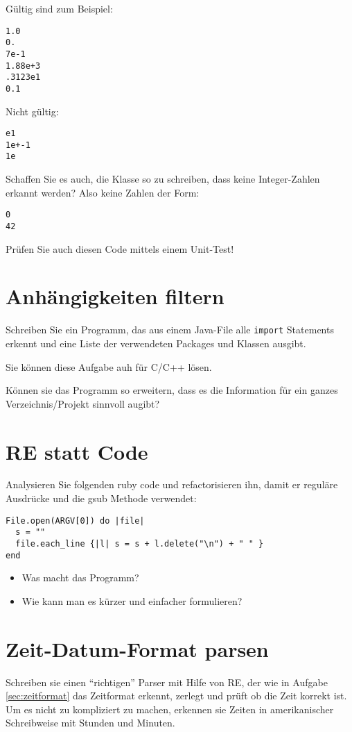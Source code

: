 \documentclass[a4paper,11pt,oneside]{scrbook}
\begin{document}
Gültig sind zum Beispiel:
\begin{lstlisting}
1.0
0.
7e-1
1.88e+3
.3123e1
0.1
\end{lstlisting}

Nicht gültig:
\begin{lstlisting}
e1
1e+-1
1e
\end{lstlisting}

Schaffen Sie es auch, die Klasse so zu schreiben, dass keine Integer-Zahlen erkannt werden? Also keine Zahlen der Form:
\begin{lstlisting}
0
42
\end{lstlisting}

Prüfen Sie auch diesen Code mittels einem Unit-Test!


\section{Anhängigkeiten filtern} %
\label{sec:anhängigkeiten_filtern}
Schreiben Sie ein Programm, das aus einem Java-File alle \texttt{import} Statements erkennt und eine Liste der verwendeten Packages und Klassen ausgibt.

Sie können diese Aufgabe auh für C/C++ lösen.

Können sie das Programm so erweitern, dass es die Information für ein ganzes Verzeichnis/Projekt sinnvoll augibt?


\section{RE statt Code} %
\label{sec:re_statt_code}
Analysieren Sie folgenden ruby code und refactorisieren ihn, damit er reguläre Ausdrücke und die gsub Methode verwendet:

\begin{lstlisting}
File.open(ARGV[0]) do |file|
  s = ""
  file.each_line {|l| s = s + l.delete("\n") + " " } 
end
\end{lstlisting}

\begin{itemize}
	\item Was macht das Programm?
	\item Wie kann man es kürzer und einfacher formulieren?
\end{itemize}



\section{Zeit-Datum-Format parsen} %
\label{sec:zeit_datum_format_parsen}
Schreiben sie einen “richtigen” Parser mit Hilfe von RE, der wie in Aufgabe \ref{sec:zeitformat} das Zeitformat erkennt, zerlegt und prüft ob die Zeit korrekt ist. Um es nicht zu kompliziert zu machen, erkennen sie Zeiten in amerikanischer Schreibweise mit Stunden und Minuten.
\end{document}
